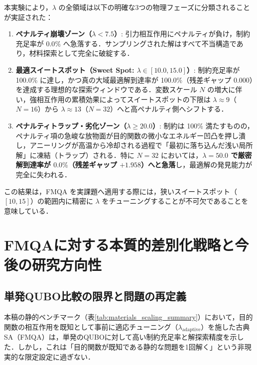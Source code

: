 \documentclass[11pt,a4paper]{ltjsarticle}
\begin{document}
本実験により，$\lambda$ の全領域は以下の明確な3つの物理フェーズに分類されることが実証された：
\begin{enumerate}\setlength{\itemsep}{1.5pt}
    \item \textbf{ペナルティ崩壊ゾーン（$\lambda < 7.5$）}:
    引力相互作用にペナルティが負け，制約充足率が $0.0\%$ へ急落する．サンプリングされた解はすべて不当構造であり，材料探索として完全に破綻する．
    \item \textbf{最適スイートスポット（Sweet Spot: $\lambda \in [10.0, 15.0]$）}:
    制約充足率が 100.0\% に達し，かつ真の大域最適解到達率が 100.0\%（残差ギャップ $0.000$）を達成する理想的な探索ウィンドウである．変数スケール $N$ の増大に伴い，強相互作用の累積効果によってスイートスポットの下限は $\lambda \approx 9$（$N=16$）から $\lambda \approx 13$（$N=32$）へと高ペナルティ側へシフトする．
    \item \textbf{ペナルティトラップ・劣化ゾーン（$\lambda \ge 20.0$）}:
    制約は 100\% 満たすものの，ペナルティ項の急峻な放物面が目的関数の微小なエネルギー凹凸を押し潰し，アニーリングが高温から冷却される過程で「最初に落ち込んだ浅い局所解」に凍結（トラップ）される．特に $N=32$ においては，\textbf{$\lambda=50.0$ で厳密解到達率が $0.0\%$（残差ギャップ $+1.958$）へと急落}し，最適解の発見能力が完全に失われる．
\end{enumerate}

この結果は，FMQA を実課題へ適用する際には，狭いスイートスポット（$[10, 15]$）の範囲内に精密に $\lambda$ をチューニングすることが不可欠であることを意味している．

\section{FMQAに対する本質的差別化戦略と今後の研究方向性}
\label{sec:differentiation_strategy}

\subsection{単発QUBO比較の限界と問題の再定義}
本稿の静的ベンチマーク（表\ref{tab:materials_scaling_summary}）において，目的関数の相互作用を既知として事前に適応チューニング（$\lambda_{\mathrm{adaptive}}$）を施した古典SA（FMQA）は，単発のQUBOに対して高い制約充足率と解探索精度を示した．しかし，これは「目的関数が既知である静的な問題を1回解く」という非現実的な限定設定に過ぎない．
\end{document}
